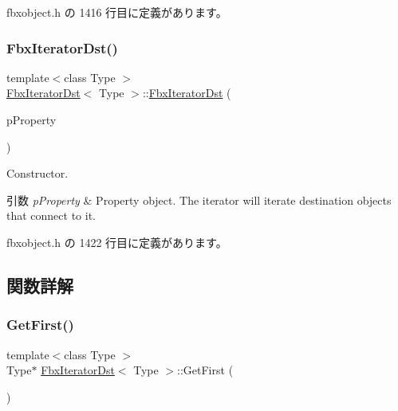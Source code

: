  fbxobject.\+h の 1416 行目に定義があります。

\mbox{\label{class_fbx_iterator_dst_a58a64aa620eda5b7a58aef5198484fde}} 
\subsubsection{\texorpdfstring{Fbx\+Iterator\+Dst()}{FbxIteratorDst()}\hspace{0.1cm}{\footnotesize\ttfamily [2/2]}}
{\footnotesize\ttfamily template$<$class Type $>$ \\
\hyperlink{class_fbx_iterator_dst}{Fbx\+Iterator\+Dst}$<$ Type $>$\+::\hyperlink{class_fbx_iterator_dst}{Fbx\+Iterator\+Dst} (\begin{DoxyParamCaption}\item[{\hyperlink{class_fbx_property}{Fbx\+Property} \&}]{p\+Property }\end{DoxyParamCaption})\hspace{0.3cm}{\ttfamily [inline]}}

Constructor. 
\begin{DoxyParams}{引数}
{\em p\+Property} & Property object. The iterator will iterate destination objects that connect to it. \\
\hline
\end{DoxyParams}


 fbxobject.\+h の 1422 行目に定義があります。



\subsection{関数詳解}
\mbox{\label{class_fbx_iterator_dst_a7e04f14a4ad50293c81ad1b35b4a206a}} 
\subsubsection{\texorpdfstring{Get\+First()}{GetFirst()}}
{\footnotesize\ttfamily template$<$class Type $>$ \\
Type$\ast$ \hyperlink{class_fbx_iterator_dst}{Fbx\+Iterator\+Dst}$<$ Type $>$\+::Get\+First (\begin{DoxyParamCaption}{ }\end{DoxyParamCaption})\hspace{0.3cm}{\ttfamily [inline]}}

